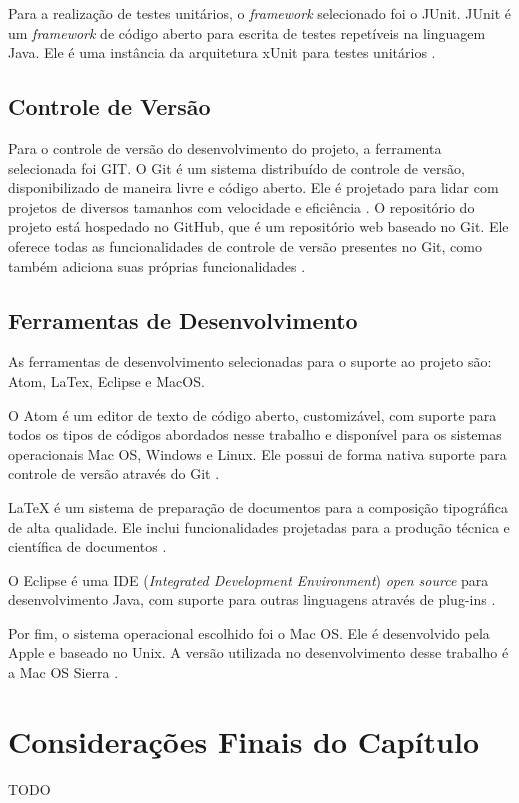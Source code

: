 Para a realização de testes unitários, o \textit{framework} selecionado foi o JUnit. JUnit é um \textit{framework} de código aberto para escrita de testes repetíveis na linguagem Java. Ele é uma instância da arquitetura xUnit para testes unitários \cite{junit2015}.

    \subsection{Controle de Versão}

Para o controle de versão do desenvolvimento do projeto, a ferramenta selecionada foi GIT. O Git é um sistema distribuído de controle de versão, disponibilizado de maneira livre e código aberto. Ele é projetado para lidar com projetos de diversos tamanhos com velocidade e eficiência \cite{git}. O repositório do projeto está hospedado no GitHub, que é um repositório web baseado no Git. Ele oferece todas as funcionalidades de controle de versão presentes no Git, como também adiciona suas próprias funcionalidades \cite{gitHub}.

    \subsection{Ferramentas de Desenvolvimento}

As ferramentas de desenvolvimento selecionadas para o suporte ao projeto são: Atom, LaTex, Eclipse e MacOS.

O Atom é um editor de texto de código aberto, customizável, com suporte para todos os tipos de códigos abordados nesse trabalho e disponível para os sistemas operacionais Mac OS, Windows e Linux. Ele possui de forma nativa suporte para controle de versão através do Git \cite{atom}.

LaTeX é um sistema de preparação de documentos para a composição tipográfica de alta qualidade. Ele inclui funcionalidades projetadas para a produção técnica e científica de documentos \cite{latex}.

O Eclipse é uma IDE (\textit{Integrated Development Environment}) \textit{open source} para
desenvolvimento Java, com suporte para outras linguagens através de plug-ins \cite{eclipse}.

Por fim, o sistema operacional escolhido foi o Mac OS. Ele é desenvolvido pela Apple e baseado no Unix. A versão utilizada no desenvolvimento desse trabalho é a Mac OS Sierra \cite{macos}.

\section{Considerações Finais do Capítulo}

TODO
